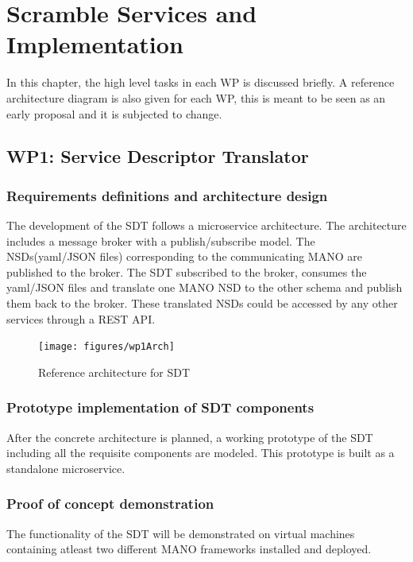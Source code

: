 \chapter{Scramble Services and Implementation}
\label{ch:wptasks}

In this chapter, the high level tasks in each WP is discussed briefly. A reference architecture diagram is also given for each WP, this is meant to be seen as an early proposal and it is subjected to change.

\section{WP1: Service Descriptor Translator}

\subsection{Requirements definitions and architecture design}

The development of the SDT follows a microservice architecture. The architecture includes a message broker with a publish/subscribe model. The NSDs(yaml/JSON files) corresponding to the communicating MANO are published to the broker. The SDT subscribed to the broker, consumes the yaml/JSON files and translate one MANO NSD to the other schema and publish them back to the broker. These translated NSDs could be accessed by any other services through a REST API.
\begin{figure}[h]
	\centering
	\texttt{[image: figures/wp1Arch]}
	\caption{Reference architecture for SDT \cite{WPDescriptionsPDF}}
	\label{fig:wp1arch}
\end{figure}

\subsection{Prototype implementation of SDT components}

After the concrete architecture is planned, a working prototype of the SDT including all the requisite components are modeled. This prototype is built as a standalone microservice.
\subsection{Proof of concept demonstration}

The functionality of the SDT will be demonstrated on virtual machines containing atleast two different MANO frameworks installed and deployed. 


